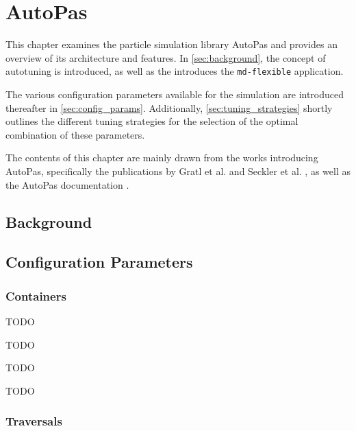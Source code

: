 \chapter[AutoPas]{AutoPas}
\label{cp:autopas}

{
	\parindent0pt
	This chapter examines the particle simulation library AutoPas and provides an overview of its architecture and features. In \autoref{sec:background}, the concept of autotuning is introduced, as well as the  introduces the \texttt{md-flexible} application.
	
	The various configuration parameters available for the simulation are introduced thereafter in \autoref{sec:config_params}. Additionally, \autoref{sec:tuning_strategies} shortly outlines the different tuning strategies for the selection of the optimal combination of these parameters.

	The contents of this chapter are mainly drawn from the works introducing AutoPas, specifically the publications by Gratl et al. \cite{Gratl2019, Gratl2021} and Seckler et al. \cite{Seckler2021}, as well as the AutoPas documentation \cite{AutoPas2025}.
}


\section{Background}
\label{sec:background}

\section{Configuration Parameters}
\label{sec:config_params}
\subsection{Containers}
\begin{description}[leftmargin=!,labelwidth=\widthof{\textbf{Verlet Cluster List }}]
	\item[\textbf{Direct Sum}] TODO
	\item[\textbf{Linked Cells}] TODO
	\item[\textbf{Verlet Lists}] TODO %
	\item[\textbf{Verlet Cluster Lists}] TODO %
\end{description}
\subsection{Traversals}
